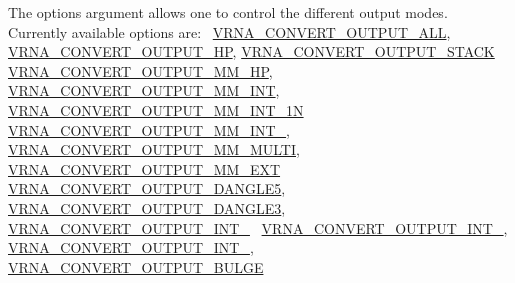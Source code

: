 The options argument allows one to control the different output modes.~\newline
Currently available options are\+:~\newline
\mbox{\hyperlink{group__energy__parameters__convert_ga8dc6aee5a806c49b71557152f9616bc4}{V\+R\+N\+A\+\_\+\+C\+O\+N\+V\+E\+R\+T\+\_\+\+O\+U\+T\+P\+U\+T\+\_\+\+A\+LL}}, \mbox{\hyperlink{group__energy__parameters__convert_gaf66fe2cb11dfcfd32d791049c254a8a4}{V\+R\+N\+A\+\_\+\+C\+O\+N\+V\+E\+R\+T\+\_\+\+O\+U\+T\+P\+U\+T\+\_\+\+HP}}, \mbox{\hyperlink{group__energy__parameters__convert_gad23522d63f8d4c50d5a5deee9bee3ef2}{V\+R\+N\+A\+\_\+\+C\+O\+N\+V\+E\+R\+T\+\_\+\+O\+U\+T\+P\+U\+T\+\_\+\+S\+T\+A\+CK}}~\newline
\mbox{\hyperlink{group__energy__parameters__convert_gaa892c7b4957459090f3e08da298cc347}{V\+R\+N\+A\+\_\+\+C\+O\+N\+V\+E\+R\+T\+\_\+\+O\+U\+T\+P\+U\+T\+\_\+\+M\+M\+\_\+\+HP}}, \mbox{\hyperlink{group__energy__parameters__convert_ga4ff223fb1f9c62cd92d9ab811ad03d55}{V\+R\+N\+A\+\_\+\+C\+O\+N\+V\+E\+R\+T\+\_\+\+O\+U\+T\+P\+U\+T\+\_\+\+M\+M\+\_\+\+I\+NT}}, \mbox{\hyperlink{group__energy__parameters__convert_gaf5d3743219f83c6348155cd81e755bbb}{V\+R\+N\+A\+\_\+\+C\+O\+N\+V\+E\+R\+T\+\_\+\+O\+U\+T\+P\+U\+T\+\_\+\+M\+M\+\_\+\+I\+N\+T\+\_\+1N}}~\newline
\mbox{\hyperlink{group__energy__parameters__convert_ga78382ec622ba99e0ac2262317bdd7316}{V\+R\+N\+A\+\_\+\+C\+O\+N\+V\+E\+R\+T\+\_\+\+O\+U\+T\+P\+U\+T\+\_\+\+M\+M\+\_\+\+I\+N\+T\+\_}}, \mbox{\hyperlink{group__energy__parameters__convert_gae67af9f1cdf7baf2865481282a5d1034}{V\+R\+N\+A\+\_\+\+C\+O\+N\+V\+E\+R\+T\+\_\+\+O\+U\+T\+P\+U\+T\+\_\+\+M\+M\+\_\+\+M\+U\+L\+TI}}, \mbox{\hyperlink{group__energy__parameters__convert_gaf14ead7ef1fdbe725ade653750fc51e3}{V\+R\+N\+A\+\_\+\+C\+O\+N\+V\+E\+R\+T\+\_\+\+O\+U\+T\+P\+U\+T\+\_\+\+M\+M\+\_\+\+E\+XT}}~\newline
\mbox{\hyperlink{group__energy__parameters__convert_ga036ffd996d8c8a9acf631760dd1da24b}{V\+R\+N\+A\+\_\+\+C\+O\+N\+V\+E\+R\+T\+\_\+\+O\+U\+T\+P\+U\+T\+\_\+\+D\+A\+N\+G\+L\+E5}}, \mbox{\hyperlink{group__energy__parameters__convert_ga34a8a5479ef885834ef32f3fb43d79bc}{V\+R\+N\+A\+\_\+\+C\+O\+N\+V\+E\+R\+T\+\_\+\+O\+U\+T\+P\+U\+T\+\_\+\+D\+A\+N\+G\+L\+E3}}, \mbox{\hyperlink{group__energy__parameters__convert_ga079aafefd5f8ab57ee5120099a34bd25}{V\+R\+N\+A\+\_\+\+C\+O\+N\+V\+E\+R\+T\+\_\+\+O\+U\+T\+P\+U\+T\+\_\+\+I\+N\+T\+\_}}~\newline
\mbox{\hyperlink{group__energy__parameters__convert_gacf770881d9034431ebe741642342a1f9}{V\+R\+N\+A\+\_\+\+C\+O\+N\+V\+E\+R\+T\+\_\+\+O\+U\+T\+P\+U\+T\+\_\+\+I\+N\+T\+\_}}, \mbox{\hyperlink{group__energy__parameters__convert_gaa307671e2631cdacad9cbe4c6583b05f}{V\+R\+N\+A\+\_\+\+C\+O\+N\+V\+E\+R\+T\+\_\+\+O\+U\+T\+P\+U\+T\+\_\+\+I\+N\+T\+\_}}, \mbox{\hyperlink{group__energy__parameters__convert_ga7092fe0be4de6f02cc0bf08e81af726a}{V\+R\+N\+A\+\_\+\+C\+O\+N\+V\+E\+R\+T\+\_\+\+O\+U\+T\+P\+U\+T\+\_\+\+B\+U\+L\+GE}}~\newline
